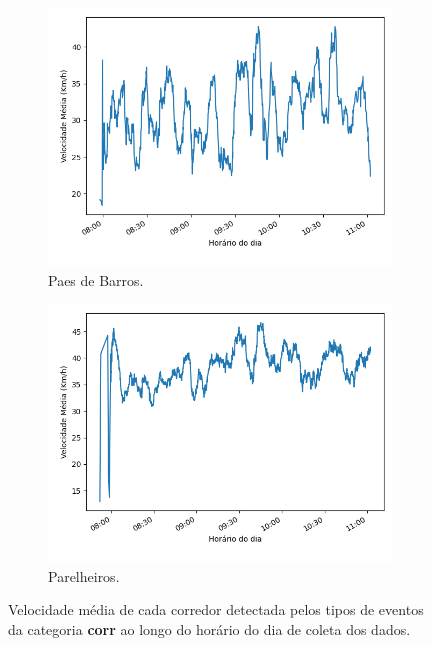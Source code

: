 \begin{figure}
\begin{subfigure}{.5\textwidth}
  \centering
  \includegraphics[width=\textwidth]{figuras/detect_graphics/avg_speed_7-dez-su-corr_PaesDeBarros.png}
  \caption{Paes de Barros.}
  \label{fig::avg_speed_Paes_de_Barros}
\end{subfigure}%
\begin{subfigure}{.5\textwidth}
  \centering
  \includegraphics[width=\textwidth]{figuras/detect_graphics/avg_speed_7-dez-su-corr_Parelheiros.png}
  \caption{Parelheiros.}
  \label{fig::avg_speed_Parelheiros}
\end{subfigure}
 \caption{Velocidade média de cada corredor detectada pelos tipos de eventos da categoria \textbf{corr} ao longo do horário do dia de coleta dos dados.}
\label{fig:all_avg_speed_corr}
\end{figure}





